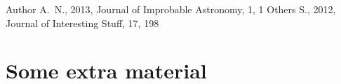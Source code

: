 \documentclass[fleqn,usenatbib]{mnras}
\begin{document}



%


\begin{thebibliography}{99}
Author A.~N., 2013, Journal of Improbable Astronomy, 1, 1
Others S., 2012, Journal of Interesting Stuff, 17, 198
\end{thebibliography}



\appendix

\section{Some extra material}




\bsp	%
\label{lastpage}
\end{document}
